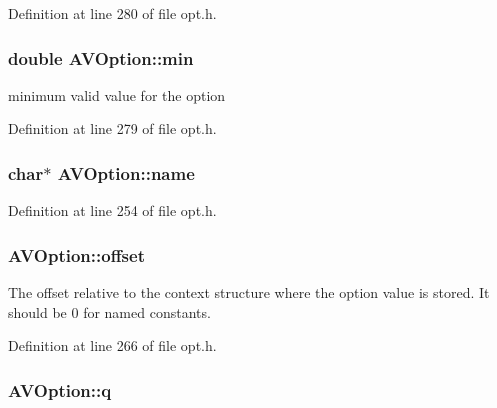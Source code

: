 Definition at line 280 of file opt.\+h.

\subsubsection[{\texorpdfstring{min}{min}}]{\setlength{\rightskip}{0pt plus 5cm}double A\+V\+Option\+::min}\hypertarget{struct_a_v_option_aaf1937648549dce7a4be35268a359a19}{}\label{struct_a_v_option_aaf1937648549dce7a4be35268a359a19}


minimum valid value for the option 



Definition at line 279 of file opt.\+h.

\subsubsection[{\texorpdfstring{name}{name}}]{ char$\ast$ A\+V\+Option\+::name}\hypertarget{struct_a_v_option_a87e81c6e58d6a94d97a98ad15a4e507c}{}\label{struct_a_v_option_a87e81c6e58d6a94d97a98ad15a4e507c}


Definition at line 254 of file opt.\+h.

\subsubsection[{\texorpdfstring{offset}{offset}}]{ A\+V\+Option\+::offset}\hypertarget{struct_a_v_option_a0ab0d209c04b72cfd72808c9e9e46a46}{}\label{struct_a_v_option_a0ab0d209c04b72cfd72808c9e9e46a46}
The offset relative to the context structure where the option value is stored. It should be 0 for named constants. 

Definition at line 266 of file opt.\+h.

\subsubsection[{\texorpdfstring{q}{q}}]{ A\+V\+Option\+::q}\hypertarget{struct_a_v_option_a3dc71ba8963767a30821b5b2bfc7e79d}{}\label{struct_a_v_option_a3dc71ba8963767a30821b5b2bfc7e79d}


